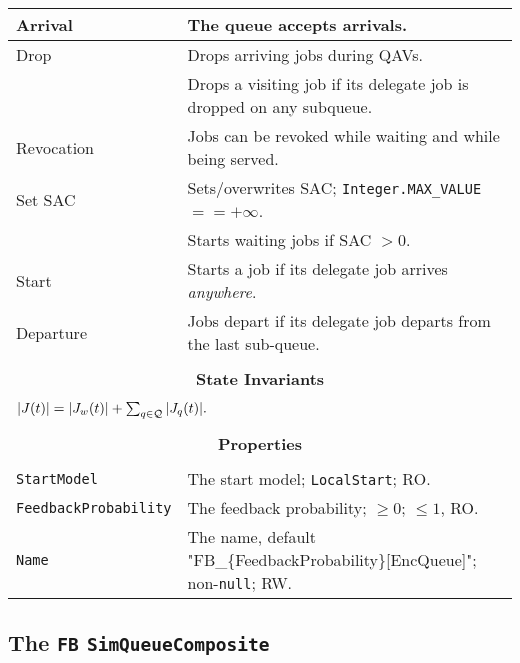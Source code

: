 \begin{tabular}{|l|l|}
	Arrival & The queue accepts arrivals. \\
	\hline
	Drop & Drops arriving jobs during QAVs. \\
	& Drops a visiting job if its delegate job is dropped on any subqueue. \\
	\hline
	Revocation & Jobs can be revoked while waiting and while being served. \\
	\hline
	Set SAC & Sets/overwrites SAC; \lstinline|Integer.MAX_VALUE| $== +\infty$. \\
	& Starts waiting jobs if SAC $> 0$. \\
	\hline
	Start & Starts a job if its delegate job arrives {\em anywhere}. \\
	\hline
	Departure & Jobs depart if its delegate job departs from the last sub-queue. \\
	\hline
	\multicolumn{2}{|c|}{} \\
	\multicolumn{2}{|c|}{\bf State  Invariants} \\
	\multicolumn{2}{|c|}{} \\
	\hline
	\multicolumn{2}{|l|}{$|J(t)| = |J_{w}(t)| + \sum_{q \in \cal{Q}} |J_{q}(t)|.$} \\
	\hline
	\multicolumn{2}{|c|}{} \\
	\multicolumn{2}{|c|}{\bf Properties} \\
	\multicolumn{2}{|c|}{} \\
	\hline
	\lstinline|StartModel| & The start model; \lstinline|LocalStart|; RO. \\
	\hline
	\lstinline|FeedbackProbability|    & The feedback probability; $\geq 0$; $\leq 1$, RO. \\
	\hline
	\lstinline|Name|       & The name, default "FB\_\{FeedbackProbability\}[EncQueue]"; non-\lstinline|null|; RW. \\
	\hline
\end{tabular}

\subsection{The \lstinline{FB} \lstinline{SimQueueComposite}}
\label{sec:FB}

